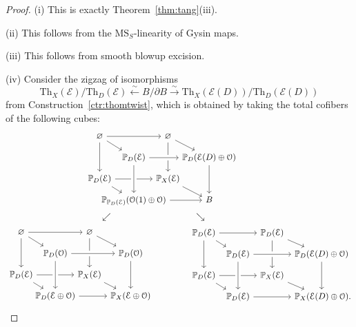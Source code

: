 \documentclass{amsart}
\numberwithin{equation}{section}
\theoremstyle{plain}
\theoremstyle{definition}
\let\scr=\mathcal
\let\bb=\mathbb
\def\P{\bb P}
\let\emptyset=\varnothing
\def\Th{\mathrm{Th}}
\def\MS{\mathrm{MS}}
\begin{document}
\begin{proof}
	(i) This is exactly Theorem~\ref{thm:tang}(iii).
	
	(ii) This follows from the $\MS_S$-linearity of Gysin maps.
	
	(iii) This follows from smooth blowup excision.
	
	(iv) Consider the zigzag of isomorphisms
	\[
	\Th_X(\scr E)/\Th_D(\scr E) \xleftarrow{\sim} B/\partial B\xrightarrow{\sim} \Th_X(\scr E(D))/\Th_D(\scr E(D))
	\]
	from Construction~\ref{ctr:thomtwist}, which is obtained by taking the total cofibers of the following cubes:
	\begin{gather*}
	\begin{tikzcd}[row sep={25,between origins}, column sep={40,between origins}, ampersand replacement=\&]
		\emptyset \ar{rr} \ar{dr} \ar{dd} \&\& \emptyset \ar{dr} \ar{dd} \\
		\& \P_D(\scr E) \ar[crossing over]{rr} \& \& \P_D(\scr E(D)\oplus \scr O) \ar{dd}  \\
		\P_D(\scr E) \ar{rr} \ar{dr} \&\& \P_X(\scr E) \ar{dr} \\
		\& \P_{\P_D(\scr E)}(\scr O(1)\oplus\scr O) \ar{rr} \ar[from=uu,crossing over] \& \& B
	\end{tikzcd}
	\qquad\qquad
	\\
	\swarrow\qquad\qquad\qquad\qquad\qquad\searrow\qquad\qquad\qquad
	\\
	\begin{tikzcd}[row sep={25,between origins}, column sep={40,between origins}, ampersand replacement=\&]
		\emptyset \ar{rr} \ar{dr} \ar{dd} \&\& \emptyset \ar{dr} \ar{dd} \\
		\& \P_D(\scr O) \ar[crossing over]{rr} \& \& \P_D(\scr O) \ar{dd}  \\
		\P_D(\scr E) \ar{rr} \ar{dr} \&\& \P_X(\scr E) \ar{dr} \\
		\& \P_D(\scr E\oplus\scr O) \ar{rr} \ar[from=uu,crossing over] \& \& \P_X(\scr E\oplus\scr O)
	\end{tikzcd}
	\qquad\qquad
	\begin{tikzcd}[row sep={25,between origins}, column sep={40,between origins}, ampersand replacement=\&]
		\P_D(\scr E) \ar{rr} \ar{dr} \ar{dd} \&\& \P_D(\scr E) \ar{dr} \ar{dd} \\
		\& \P_D(\scr E) \ar[crossing over]{rr} \& \& \P_D(\scr E(D)\oplus \scr O) \ar{dd}  \\
		\P_D(\scr E) \ar{rr} \ar{dr} \&\& \P_X(\scr E) \ar{dr} \\
		\& \P_D(\scr E) \ar{rr} \ar[from=uu,crossing over] \& \& \P_X(\scr E(D)\oplus\scr O)\rlap.

\end{tikzcd}
\end{gather*}
\end{proof}
\end{document}

